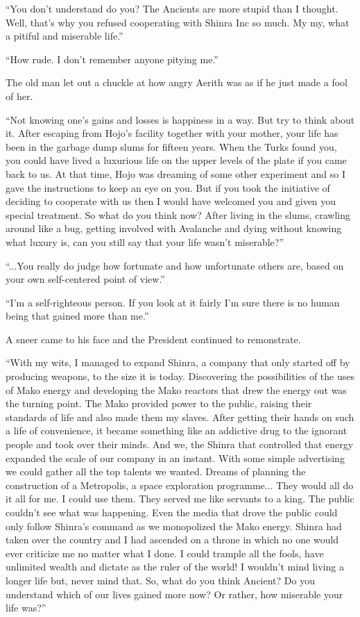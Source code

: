 \documentclass[oneside]{book}
\begin{document}
“You don't understand do you? The Ancients are more stupid than I thought. Well, that's why you refused cooperating with Shinra Inc so much. My my, what a pitiful and miserable life.”

“How rude. I don't remember anyone pitying me.”

The old man let out a chuckle at how angry Aerith was as if he just made a fool of her.

“Not knowing one's gains and losses is happiness in a way. But try to think about it. After escaping from Hojo's facility together with your mother, your life has been in the garbage dump slums for fifteen years. When the Turks found you, you could have lived a luxurious life on the upper levels of the plate if you came back to us. At that time, Hojo was dreaming of some other experiment and so I gave the instructions to keep an eye on you. But if you took the initiative of deciding to cooperate with us then I would have welcomed you and given you special treatment. So what do you think now? After living in the slums, crawling around like a bug, getting involved with Avalanche and dying without knowing what luxury is, can you still say that your life wasn't miserable?”

“...You really do judge how fortunate and how unfortunate others are, based on your own self-centered point of view.”

“I'm a self-righteous person. If you look at it fairly I'm sure there is no human being that gained more than me.”

A sneer came to his face and the President continued to remonstrate.

“With my wits, I managed to expand Shinra, a company that only started off by producing weapons, to the size it is today. Discovering the possibilities of the uses of Mako energy and developing the Mako reactors that drew the energy out was the turning point. The Mako provided power to the public, raising their standards of life and also made them my slaves. After getting their hands on such a life of convenience, it became something like an addictive drug to the ignorant people and took over their minds. And we, the Shinra that controlled that energy expanded the scale of our company in an instant. With some simple advertising we could gather all the top talents we wanted. Dreams of planning the construction of a Metropolis, a space exploration programme... They would all do it all for me. I could use them. They served me like servants to a king. The public couldn't see what was happening. Even the media that drove the public could only follow Shinra's command as we monopolized the Mako energy. Shinra had taken over the country and I had ascended on a throne in which no one would ever criticize me no matter what I done. I could trample all the fools, have unlimited wealth and dictate as the ruler of the world! I wouldn't mind living a longer life but, never mind that. So, what do you think Ancient? Do you understand which of our lives gained more now? Or rather, how miserable your life was?”
\end{document}
